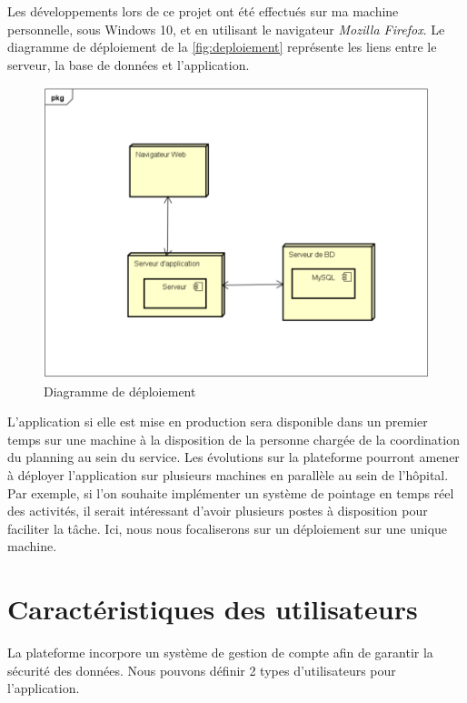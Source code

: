 \documentclass[noposter]{polytech/polytech}
\begin{document}
Les développements lors de ce projet ont été effectués sur ma machine personnelle, sous Windows 10, et en utilisant le navigateur \textit{Mozilla Firefox}. Le diagramme de déploiement de la \autoref{fig:deploiement} représente les liens entre le serveur, la base de données et l'application. 

\begin{figure}
	\includegraphics[scale=0.8]{images/deploiement}
	\caption{Diagramme de déploiement}
	\label{fig:deploiement}
\end{figure}

L'application si elle est mise en production sera disponible dans un premier temps sur une machine à la disposition de la personne chargée de la coordination du planning au sein du service. Les évolutions sur la plateforme pourront amener à déployer l'application sur plusieurs machines en parallèle au sein de l'hôpital. Par exemple, si l'on souhaite implémenter un système de pointage en temps réel des activités, il serait intéressant d'avoir plusieurs postes à disposition pour faciliter la tâche. Ici, nous nous focaliserons sur un déploiement sur une unique machine. 


\section{Caractéristiques des utilisateurs}
\label{sec:caracUtili}

La plateforme incorpore un système de gestion de compte afin de garantir la sécurité des données. Nous pouvons définir 2 types d'utilisateurs pour l'application.
\end{document}
